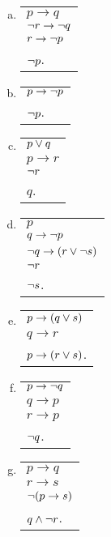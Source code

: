 \begin{enumerate}[{\bf 1.}]
\begin{multicols}{3}
\begin{enumerate}[a)]
\item \begin{tabular}{l}
$p\to q$ \\
$\lnot r \to \lnot q$ \\
\underline{$r\to\lnot p$} \\
$\lnot p$.
\end{tabular}

\item \begin{tabular}{l}
\underline{$p\to\lnot p$} \\
$\lnot p$.
\end{tabular}

\item \begin{tabular}{l}
$p\vee q$ \\
$p\to r$ \\
\underline{$\lnot r$} \\
$q$.
\end{tabular}

\item \begin{tabular}{l}
$p$ \\
$q\to\lnot p$ \\
$\lnot q\to(r\vee\lnot s)$ \\
\underline{$\lnot r$} \\
$\lnot s$.
\end{tabular}

\item \begin{tabular}{l}
$p\to(q\vee s)$ \\
\underline{$q\to r$} \\
$p\to(r\vee s)$.
\end{tabular}

\item \begin{tabular}{l}
$p\to\lnot q$ \\
$q\to p$ \\
\underline{$r\to p$} \\
$\lnot q$.
\end{tabular}

\item \begin{tabular}{l}
$p\to q$ \\
$r\to s$ \\
\underline{$\lnot(p\to s)$} \\
$q\wedge\lnot r$.
\end{tabular}
\end{enumerate}
\end{multicols}
\end{enumerate}

